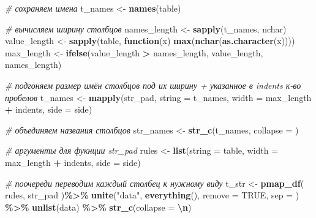 \documentclass[
]{book}
\newenvironment{Shaded}{\begin{snugshade}}{\end{snugshade}}
\newcommand{\AttributeTok}[1]{\textcolor[rgb]{0.13,0.29,0.53}{#1}}
\newcommand{\CommentTok}[1]{\textcolor[rgb]{0.56,0.35,0.01}{\textit{#1}}}
\newcommand{\ConstantTok}[1]{\textcolor[rgb]{0.56,0.35,0.01}{#1}}
\newcommand{\ControlFlowTok}[1]{\textcolor[rgb]{0.13,0.29,0.53}{\textbf{#1}}}
\newcommand{\FunctionTok}[1]{\textcolor[rgb]{0.13,0.29,0.53}{\textbf{#1}}}
\newcommand{\NormalTok}[1]{#1}
\newcommand{\OtherTok}[1]{\textcolor[rgb]{0.56,0.35,0.01}{#1}}
\newcommand{\SpecialCharTok}[1]{\textcolor[rgb]{0.81,0.36,0.00}{\textbf{#1}}}
\newcommand{\StringTok}[1]{\textcolor[rgb]{0.31,0.60,0.02}{#1}}
\begin{document}
\begin{Shaded}
\begin{Highlighting}[]
  \CommentTok{\# сохраняем имена}
\NormalTok{  t\_names      }\OtherTok{\textless{}{-}} \FunctionTok{names}\NormalTok{(table)}
  
  \CommentTok{\# вычисляем ширину столбцов}
\NormalTok{  names\_length }\OtherTok{\textless{}{-}} \FunctionTok{sapply}\NormalTok{(t\_names, nchar) }
\NormalTok{  value\_length }\OtherTok{\textless{}{-}} \FunctionTok{sapply}\NormalTok{(table, }\ControlFlowTok{function}\NormalTok{(x) }\FunctionTok{max}\NormalTok{(}\FunctionTok{nchar}\NormalTok{(}\FunctionTok{as.character}\NormalTok{(x))))}
\NormalTok{  max\_length   }\OtherTok{\textless{}{-}} \FunctionTok{ifelse}\NormalTok{(value\_length }\SpecialCharTok{\textgreater{}}\NormalTok{ names\_length, value\_length, names\_length)}
  
  \CommentTok{\# подгоняем размер имён столбцов под их ширину + указанное в indents к{-}во пробелов }
\NormalTok{  t\_names }\OtherTok{\textless{}{-}} \FunctionTok{mapply}\NormalTok{(str\_pad, }
                    \AttributeTok{string =}\NormalTok{ t\_names, }
                    \AttributeTok{width  =}\NormalTok{ max\_length }\SpecialCharTok{+}\NormalTok{ indents, }
                    \AttributeTok{side   =}\NormalTok{ side)}
  
  \CommentTok{\# объединяем названия столбцов}
\NormalTok{  str\_names }\OtherTok{\textless{}{-}} \FunctionTok{str\_c}\NormalTok{(t\_names, }\AttributeTok{collapse =} \StringTok{\textquotesingle{}\textquotesingle{}}\NormalTok{)}
  
  \CommentTok{\# аргументы для фукнции str\_pad}
\NormalTok{  rules }\OtherTok{\textless{}{-}} \FunctionTok{list}\NormalTok{(}\AttributeTok{string =}\NormalTok{ table, }\AttributeTok{width =}\NormalTok{ max\_length }\SpecialCharTok{+}\NormalTok{ indents, }\AttributeTok{side =}\NormalTok{ side)}
  
  \CommentTok{\# поочереди переводим каждый столбец к нужному виду}
\NormalTok{  t\_str }\OtherTok{\textless{}{-}}   \FunctionTok{pmap\_df}\NormalTok{( rules, str\_pad )}\SpecialCharTok{\%\textgreater{}\%}
    \FunctionTok{unite}\NormalTok{(}\StringTok{"data"}\NormalTok{, }\FunctionTok{everything}\NormalTok{(), }\AttributeTok{remove =} \ConstantTok{TRUE}\NormalTok{, }\AttributeTok{sep =} \StringTok{\textquotesingle{}\textquotesingle{}}\NormalTok{) }\SpecialCharTok{\%\textgreater{}\%}
    \FunctionTok{unlist}\NormalTok{(data) }\SpecialCharTok{\%\textgreater{}\%}
    \FunctionTok{str\_c}\NormalTok{(}\AttributeTok{collapse =} \StringTok{\textquotesingle{}}\SpecialCharTok{\textbackslash{}n}\StringTok{\textquotesingle{}}\NormalTok{) }
  

\end{Highlighting}
\end{Shaded}
\end{document}
